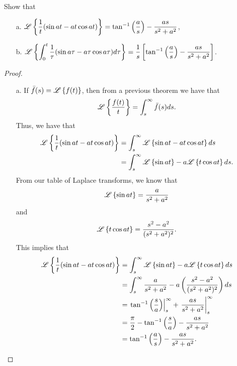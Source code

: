\begin{problem}{3.10}
  Show that
  \begin{enumerate}
    \item[a.] $\displaystyle \mathscr{L}\left\{ {\frac{1}{t}(\sin at - at \cos at)} \right\} = \tan^{-1}\left(\frac{a}{s}\right) - \frac{as}{s^2 + a^2}$,
    \item[b.] $\displaystyle \mathscr{L}\left\{ {\int_0^t \frac{1}{\tau}(\sin a \tau - a\tau \cos a\tau) d\tau} \right\} = \frac{1}{s}\left[\tan^{-1}\left(\frac{a}{s}\right) - \frac{as}{s^2 + a^2}\right]$.
  \end{enumerate}
\end{problem}

\begin{proof}
  \begin{enumerate}
    \item[a.] If $\bar{f}(s) = \mathscr{L}\left\{ {f(t)} \right\}$, then from a previous theorem we have that
      \begin{align*}
        \mathscr{L}\left\{ {\frac{f(t)}{t}} \right\} = \int_s^\infty \bar{f}(s) ds.
      \end{align*}
      Thus, we have that
      \begin{align*}
        \mathscr{L}\left\{ {\frac{1}{t}(\sin at - at \cos at)} \right\}
        &= \int_s^\infty \mathscr{L}\left\{ {\sin at - at \cos at} \right\}ds \\
        &= \int_s^\infty \mathscr{L}\left\{ {\sin at} \right\} - a\mathscr{L}\left\{ {t \cos at} \right\}ds.
      \end{align*}
      From our table of Laplace transforms,  we know that
      \begin{align*}
        \mathscr{L}\left\{ {\sin at} \right\} = \frac{a}{s^2 + a^2}
      \end{align*}
      and
      \begin{align*}
        \mathscr{L}\left\{ {t\cos at} \right\} = \frac{s^2 - a^2}{(s^2 + a^2)^2}.
      \end{align*}
      This implies that
      \begin{align*}
        \mathscr{L}\left\{ {\frac{1}{t}(\sin at - at \cos at)} \right\}
        &= \int_s^\infty \mathscr{L}\left\{ {\sin at} \right\} - a\mathscr{L}\left\{ {t \cos at} \right\}ds \\
        &= \int_s^\infty \frac{a}{s^2 + a^2} - a\left(\frac{s^2 - a^2}{(s^2 + a^2)^2}\right)ds \\
        &= \left.\tan^{-1}\left(\frac{s}{a}\right)\right\rvert_s^\infty + \left.\frac{as}{s^2 + a^2}\right\rvert_s^\infty \\
        &= \frac{\pi}{2} - \tan^{-1}\left(\frac{s}{a}\right) - \frac{as}{s^2+a^2} \\
        &= \tan^{-1}\left(\frac{a}{s}\right) - \frac{as}{s^2 + a^2}.
      \end{align*}


\end{enumerate}
\end{proof}
